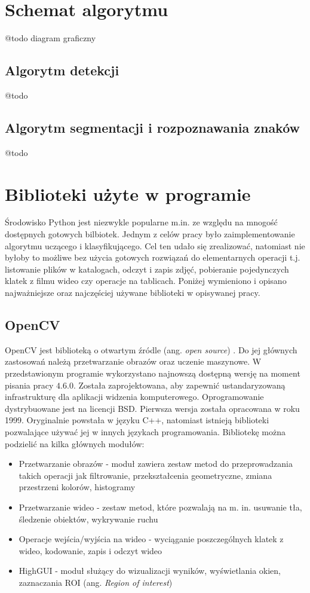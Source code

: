 \section{Schemat algorytmu}
@todo
diagram graficzny

\subsection{Algorytm detekcji}
@todo

\subsection{Algorytm segmentacji i rozpoznawania znaków}
@todo


\section{Biblioteki użyte w programie}
Środowisko Python jest niezwykle popularne m.in. ze względu na mnogość dostępnych gotowych bilbiotek.
Jednym z celów pracy było zaimplementowanie algorytmu uczącego i klasyfikującego.
Cel ten udało się zrealizować, natomiast nie byłoby to możliwe bez użycia gotowych rozwiązań do elementarnych operacji t.j. listowanie plików w katalogach, odczyt i zapis zdjęć, pobieranie pojedynczych klatek z filmu wideo czy operacje na tablicach.
Poniżej wymieniono i opisano najważniejsze oraz najczęściej używane biblioteki w opisywanej pracy.

\subsection{OpenCV}
OpenCV jest biblioteką o otwartym źródle (ang. \textit{open source}) \cite{open_cv,open_cv_docs} .
Do jej głównych zastosowań należą przetwarzanie obrazów oraz uczenie maszynowe.
W przedstawionym programie wykorzystano najnowszą dostępną wersję na moment pisania pracy $4.6.0$.
Została zaprojektowana, aby zapewnić ustandaryzowaną infrastrukturę dla aplikacji widzenia komputerowego.
Oprogramowanie dystrybuowane jest na licencji BSD.
Pierwsza wersja została opracowana w roku 1999.
Oryginalnie powstała w języku C++, natomiast istnieją biblioteki pozwalające używać jej w innych językach programowania.
Bibliotekę można podzielić na kilka głównych modułów:
\begin{itemize}
    \item Przetwarzanie obrazów - moduł zawiera zestaw metod do przeprowadzania takich operacji jak filtrowanie, przekształcenia geometryczne, zmiana przestrzeni kolorów, histogramy
    \item Przetwarzanie wideo - zestaw metod, które pozwalają na m. in. usuwanie tła, śledzenie obiektów, wykrywanie ruchu
    \item Operacje wejścia/wyjścia na wideo - wyciąganie poszczególnych klatek z wideo, kodowanie, zapis i odczyt wideo
    \item HighGUI - moduł służący do wizualizacji wyników, wyświetlania okien, zaznaczania ROI (ang. \textit{Region of interest})
\end{itemize}

